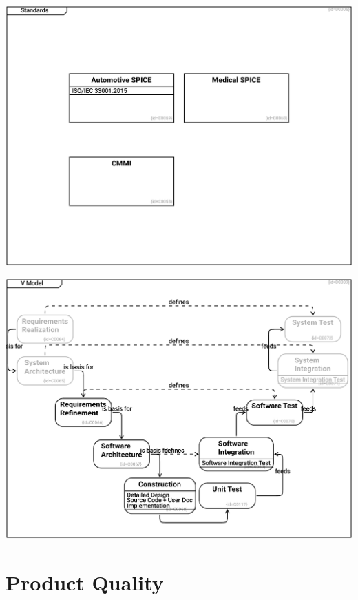 \documentclass{article}
\begin{document}
\includegraphics[width= 1.0\linewidth]{quality_export/D0006_Standards.pdf}


\includegraphics[width= 1.0\linewidth]{quality_export/D0009_V_Model.pdf}


\section{Product Quality}
\end{document}

